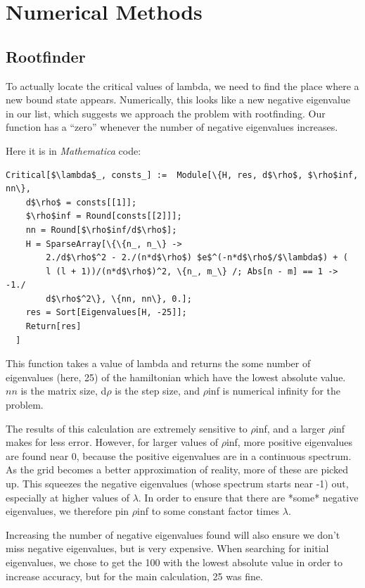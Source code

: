 \documentclass[12pt,twoside]{reedthesis}
\begin{document}
\chapter{Numerical Methods}

\section{Rootfinder}

To actually locate the critical values of lambda, we need to find the place where a new bound state appears. Numerically, this looks like a new negative eigenvalue in our list, which suggests we approach the problem with rootfinding. Our function has a ``zero'' whenever the number of negative eigenvalues increases.

Here it is in \emph{Mathematica} code:
\begin{Verbatim}[commandchars=\\\{\}, codes={\catcode`$=3}]
Critical[$\lambda$_, consts_] :=  Module[\{H, res, d$\rho$, $\rho$inf, nn\},
    d$\rho$ = consts[[1]];
    $\rho$inf = Round[consts[[2]]];
    nn = Round[$\rho$inf/d$\rho$];
    H = SparseArray[\{\{n_, n_\} -> 
        2./d$\rho$^2 - 2./(n*d$\rho$) $e$^(-n*d$\rho$/$\lambda$) + (
        l (l + 1))/(n*d$\rho$)^2, \{n_, m_\} /; Abs[n - m] == 1 -> -1./
        d$\rho$^2\}, \{nn, nn\}, 0.];
    res = Sort[Eigenvalues[H, -25]];
    Return[res]
  ]
\end{Verbatim}
This function takes a value of lambda and returns the some number of eigenvalues (here, 25)  of the hamiltonian which have the lowest absolute value. $nn$ is the matrix size, d$\rho$ is the step size, and $\rho$inf is numerical infinity for the problem.

The results of this calculation are extremely sensitive to $\rho$inf, and a larger $\rho$inf makes for less error. However, for larger values of $\rho$inf, more positive eigenvalues are found near 0, because the positive eigenvalues are in a continuous spectrum. As the grid becomes a better approximation of reality, more of these are picked up. This squeezes the negative eigenvalues (whose spectrum starts near -1) out, especially at higher values of $\lambda$. In order to ensure that there are *some* negative eigenvalues, we therefore pin $\rho$inf to some constant factor times $\lambda$. 

Increasing the number of negative eigenvalues found will also ensure we don't miss negative eigenvalues, but is very expensive. When searching for initial eigenvalues, we chose to get the 100 with the lowest absolute value in order to increase accuracy, but for the main calculation, 25 was fine.
\end{document}
